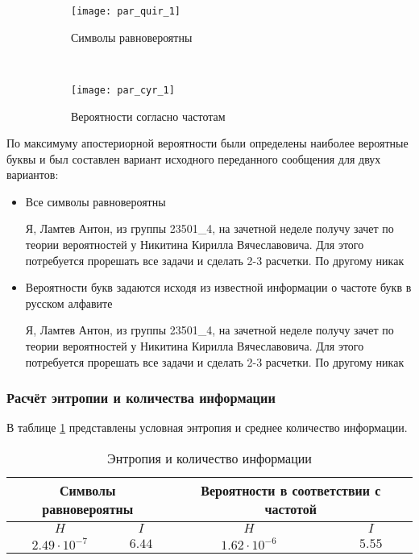 \begin{figure}[H]
\begin{center}
	\begin{subfigure}[b]{0.45\textwidth}
		\texttt{[image: par\_quir\_1]}
		\caption{Символы равновероятны}
	\end{subfigure}
	~
	\begin{subfigure}[b]{0.45\textwidth}
		\texttt{[image: par\_cyr\_1]}
		\caption{Вероятности согласно частотам}
	\end{subfigure}
	\caption{}
	\label{pic:3:21}
\end{center}
\end{figure}

По максимуму апостериорной вероятности были определены наиболее вероятные буквы и был составлен вариант исходного переданного сообщения для двух вариантов:

\begin{itemize}
	\item Все символы равновероятны
	
	
	Я, Ламтев Антон, из группы 23501\_4, на зачетной неделе получу зачет по теории вероятностей у Никитина Кирилла Вячеславовича. Для этого потребуется прорешать все задачи и сделать 2-3 расчетки. По другому никак	
	
	\item Вероятности букв задаются исходя из известной информации о частоте букв в русском алфавите	
	
	
	Я, Ламтев Антон, из группы 23501\_4, на зачетной неделе получу зачет по теории вероятностей у Никитина Кирилла Вячеславовича. Для этого потребуется прорешать все задачи и сделать 2-3 расчетки. По другому никак
		
\end{itemize}

\subsubsection{Расчёт энтропии и количества информации}

В таблице \ref{table:entr:info} представлены условная энтропия и среднее количество информации.

\begin{table}[H]
\begin{center}
	\caption{Энтропия и количество информации}
	\label{table:entr:info}
	\def\tabcolsep{6pt}
	\begin{tabular}{|c|c|c|c|}
		\hline
		\multicolumn{2}{|c|}{Символы равновероятны} &
		\multicolumn{2}{c|}{Вероятности в соответствии с частотой} \\ 
		\hline
		$H$ &
		$I$ &
		$H$ &
		$I$ \\ 
		\hline
		$2.49 \cdot 10^{-7}$ &
		$6.44$ &
		$1.62 \cdot 10^{-6}$ &
		$5.55$ \\
		\hline
	\end{tabular}
\end{center}
\end{table}

